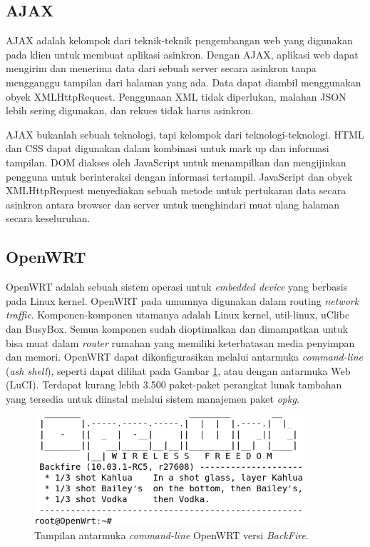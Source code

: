   \subsection{AJAX}
    AJAX adalah kelompok dari teknik-teknik pengembangan web yang digunakan pada klien untuk membuat aplikasi asinkron. Dengan AJAX, aplikasi web dapat mengirim dan menerima data dari sebuah server secara asinkron tanpa mengganggu tampilan dari halaman yang ada. Data dapat diambil menggunakan obyek XMLHttpRequest. Penggunaan XML tidak diperlukan, malahan JSON lebih sering digunakan, dan rekues tidak harus asinkron.

    AJAX bukanlah sebuah teknologi, tapi kelompok dari teknologi-teknologi. HTML dan CSS dapat digunakan dalam kombinasi untuk mark up dan informasi tampilan. DOM diakses oleh JavaScript untuk menampilkan dan mengijinkan pengguna untuk berinteraksi dengan informasi tertampil. JavaScript dan obyek XMLHttpRequest menyediakan sebuah metode untuk pertukaran data secara asinkron antara browser dan server untuk menghindari muat ulang halaman secara keseluruhan.


  \subsection{OpenWRT}
    OpenWRT adalah sebuah sistem operasi untuk \emph{embedded device} yang berbasis pada Linux kernel. OpenWRT pada umumnya digunakan dalam routing \emph{network traffic}. Komponen-komponen utamanya adalah Linux kernel, util-linux, uClibc dan BusyBox. Semua komponen sudah dioptimalkan dan dimampatkan untuk bisa muat dalam \emph{router} rumahan yang memiliki keterbatasan media penyimpan dan memori. OpenWRT dapat dikonfigurasikan melalui antarmuka \emph{command-line} (\emph{ash shell}), seperti dapat dilihat pada Gambar \ref{openwrt}, atau dengan antarmuka Web (LuCI). Terdapat kurang lebih 3.500 paket-paket perangkat lunak tambahan yang tersedia untuk diinstal melalui sistem manajemen paket \emph{opkg}.

      \begin{figure}[ht!]
        \centering
          \includegraphics[width=10cm]{gambar/openwrt}
          \caption{Tampilan antarmuka \emph{command-line} OpenWRT versi \emph{BackFire}.}
          \label{openwrt}
      \end{figure}

